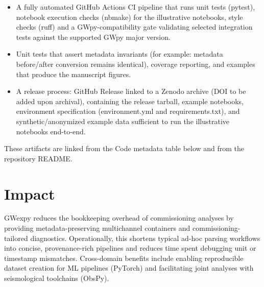 \documentclass[preprint,12pt,a4paper]{elsarticle}
\begin{document}
\begin{itemize}
  \item A fully automated GitHub Actions CI pipeline that runs unit tests (pytest), notebook execution checks (nbmake) for the illustrative notebooks, style checks (ruff) and a GWpy-compatibility gate validating selected integration tests against the supported GWpy major version.
  \item Unit tests that assert metadata invariants (for example: metadata before/after conversion remains identical), coverage reporting, and examples that produce the manuscript figures.
  \item A release process: GitHub Release linked to a Zenodo archive (DOI to be added upon archival), containing the release tarball, example notebooks, environment specification (environment.yml and requirements.txt), and synthetic/anonymized example data sufficient to run the illustrative notebooks end-to-end.
\end{itemize}

These artifacts are linked from the Code metadata table below and from the repository README.

\section{Impact}
GWexpy reduces the bookkeeping overhead of commissioning analyses by providing metadata-preserving multichannel containers and commissioning-tailored diagnostics.  Operationally, this shortens typical ad-hoc parsing workflows into concise, provenance-rich pipelines and reduces time spent debugging unit or timestamp mismatches.  Cross-domain benefits include enabling reproducible dataset creation for ML pipelines (PyTorch) and facilitating joint analyses with seismological toolchains (ObsPy).

\end{document}
